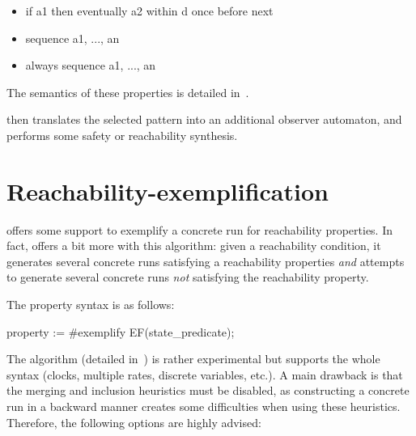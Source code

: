 \begin{itemize}
	\item
\begin{IMITATORproperty}
if a1 then eventually a2 within d once before next
\end{IMITATORproperty}

	\item
\begin{IMITATORproperty}
sequence a1, ..., an
\end{IMITATORproperty}

	\item
\begin{IMITATORproperty}
always sequence a1, ..., an
\end{IMITATORproperty}

\end{itemize}

The semantics of these properties is detailed in~\cite{Andre13ICECCS}.

\imitator{} then translates the selected pattern into an additional observer automaton, and performs some safety or reachability synthesis.



\section{Reachability-exemplification}\label{section:algorithm:EFexemplify}

\imitator{} offers some support to exemplify a concrete run for reachability properties.
In fact, \imitator{} offers a bit more with this algorithm:
given a reachability condition, it generates several concrete runs satisfying a reachability properties \emph{and} attempts to generate several concrete runs \emph{not} satisfying the reachability property.

The property syntax is as follows:

\begin{IMITATORproperty}
property := #exemplify EF(state_predicate);
\end{IMITATORproperty}

The algorithm (detailed in~\cite{AWUH22}) is rather experimental but supports the whole \imitator{} syntax (clocks, multiple rates, discrete variables, etc.).
A main drawback is that the merging and inclusion heuristics must be disabled, as constructing a concrete run in a backward manner creates some difficulties when using these heuristics.
Therefore, the following options are highly advised:

